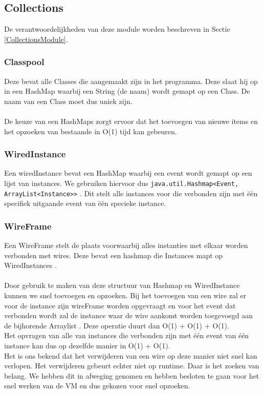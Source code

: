 \documentclass[]{article}
\begin{document}
\subsection{Collections}
De verantwoordelijkheden van deze module worden beschreven in Sectie \ref{CollectionsModule}.
\subsubsection{Classpool}
\label{ClasspoolClass}
Deze bevat alle Classes die aangemaakt zijn in het programma. Deze slaat hij op in een HashMap \cite{hashmap} waarbij een String (de naam) wordt gemapt op een Class. De naam van een Class moet dus uniek zijn.\\\\
De keuze van een HashMaps \cite{hashmap} zorgt ervoor dat het toevoegen van nieuwe items en het opzoeken van bestaande in O(1) tijd kan gebeuren.
\subsubsection{WiredInstance}
Een wiredInstance bevat een HashMap \cite{hashmap} waarbij een event wordt gemapt op een lijst van instances. We gebruiken hiervoor dus \texttt{java.util.Hashmap<Event, ArrayList<Instance>>} \cite{hashmap} \cite{arraylist}.  Dit stelt alle instances voor die verbonden zijn met \"{e}\"{e}n specifiek uitgaande event van \"{e}\"{e}n specieke instance.
\subsubsection{WireFrame}
\label{WireFrameClass}
Een WireFrame stelt de plaats voorwaarbij alles instanties met elkaar worden verbonden met wires.
Deze bevat een hashmap die Instances mapt op WiredInstances \cite{hashmap}.\\\\
Door gebruik te maken van deze structuur van Hashmap \cite{hashmap} en WiredInstance kunnen we snel toevoegen en opzoeken. Bij het toevoegen van een wire zal er voor de instance zijn wireFrame worden opgevraagt en voor het event dat verbonden wordt zal de instance waar de wire aankomt worden toegevoegd aan de bijhorende Arraylist \cite{arraylist}. Deze operatie duurt dan O(1) + O(1) + O(1).\\
Het opvragen van alle van instances die verbonden zijn met \'{e}\'{e}n event van \'{e}\'{e}n instance kan dus op dezelfde manier in O(1) + O(1).\\ Het is ons bekend dat het verwijderen van een wire op deze manier niet snel kan verlopen. Het verwijderen gebeurt echter niet op runtime. Daar is het zoeken van belang. We hebben dit in afweging genomen en hebben besloten te gaan voor het snel werken van de VM en dus gekozen voor snel opzoeken.
\end{document}
